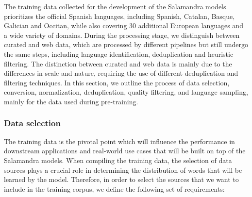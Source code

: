 The training data collected for the development of the Salamandra models prioritizes the official Spanish languages, including Spanish, Catalan, Basque, Galician and Occitan, while also covering 30 additional European languages and a wide variety of domains. 
During the processing stage, we distinguish between curated and web data, which are processed by different pipelines but still undergo the same steps, including language identification, deduplication and heuristic filtering. 
The distinction between curated and web data is mainly due to the differences in scale and nature, requiring the use of different deduplication and filtering techniques. 
In this section, we outline the process of data selection, conversion, normalization, deduplication, quality filtering, and language sampling, mainly for the data used during pre-training.

\subsubsection{Data selection}
\label{subsubsec:data-selection}


The training data is the pivotal point which will influence the performance in downstream applications and real-world use cases that will be built on top of the Salamandra models. When compiling the training data, the selection of data sources plays a crucial role in determining the distribution of words that will be learned by the model. Therefore, in order to select the sources that we want to include in the training corpus, we define the following set of requirements:


